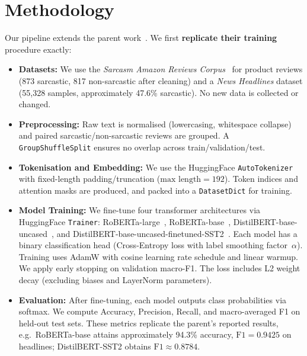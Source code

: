 
\section{Methodology}\label{sec:methodology}

Our pipeline extends the parent work~\cite{oprea2025llm}. We first \textbf{replicate their training} procedure exactly:

\begin{itemize}[leftmargin=*]
    \item \textbf{Datasets:} We use the \emph{Sarcasm Amazon Reviews Corpus}~\cite{filatova2012irony} for product reviews (873 sarcastic, 817 non-sarcastic after cleaning) and a \emph{News Headlines} dataset (55{,}328 samples, approximately 47.6\% sarcastic). No new data is collected or changed.

    \item \textbf{Preprocessing:} Raw text is normalised (lowercasing, whitespace collapse) and paired sarcastic/non-sarcastic reviews are grouped. A \texttt{GroupShuffleSplit} ensures no overlap across train/validation/test.

    \item \textbf{Tokenisation and Embedding:} We use the HuggingFace \texttt{AutoTokenizer}~\cite{wolf2020transformers} with fixed-length padding/truncation ($\text{max length} = 192$). Token indices and attention masks are produced, and packed into a \texttt{DatasetDict} for training.

    \item \textbf{Model Training:} We fine-tune four transformer architectures via HuggingFace \texttt{Trainer}: RoBERTa-large~\cite{liu2019roberta}, RoBERTa-base~\cite{liu2019roberta}, DistilBERT-base-uncased~\cite{sanh2019distilbert}, and DistilBERT-base-uncased-finetuned-SST2~\cite{sanh2019distilbert}. Each model has a binary classification head (Cross-Entropy loss with label smoothing factor~$\alpha$). Training uses AdamW with cosine learning rate schedule and linear warmup. We apply early stopping on validation macro-F1. The loss includes L2 weight decay (excluding biases and LayerNorm parameters).

    \item \textbf{Evaluation:} After fine-tuning, each model outputs class probabilities via softmax. We compute Accuracy, Precision, Recall, and macro-averaged F1 on held-out test sets. These metrics replicate the parent's reported results, e.g.\ RoBERTa-base attains approximately 94.3\% accuracy, $\text{F1} = 0.9425$ on headlines; DistilBERT-SST2 obtains $\text{F1} \approx 0.8784$.
\end{itemize}

